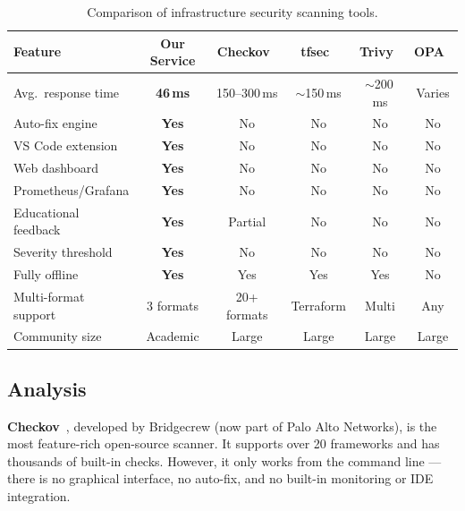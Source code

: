 \begin{table}[H]
\centering
\begin{tabular}{|l|c|c|c|c|c|}
\hline
\textbf{Feature} & \textbf{Our Service} & \textbf{Checkov}~\cite{bridgecrew2024checkov} & \textbf{tfsec}~\cite{aquasecurity2024tfsec} & \textbf{Trivy}~\cite{aquasecurity2024trivy} & \textbf{OPA}~\cite{openpolicyagent2024} \\
\hline
Avg.\ response time    & \textbf{46\,ms} & 150--300\,ms & $\sim$150\,ms & $\sim$200\,ms & Varies \\
\hline
Auto-fix engine       & \textbf{Yes}    & No           & No            & No            & No     \\
\hline
VS Code extension     & \textbf{Yes}    & No           & No            & No            & No     \\
\hline
Web dashboard         & \textbf{Yes}    & No           & No            & No            & No     \\
\hline
Prometheus/Grafana    & \textbf{Yes}    & No           & No            & No            & No     \\
\hline
Educational feedback  & \textbf{Yes}    & Partial      & No            & No            & No     \\
\hline
Severity threshold    & \textbf{Yes}    & No           & No            & No            & No     \\
\hline
Fully offline         & \textbf{Yes}    & Yes          & Yes           & Yes           & No     \\
\hline
Multi-format support  & 3 formats       & 20+ formats  & Terraform     & Multi         & Any    \\
\hline
Community size        & Academic        & Large        & Large         & Large         & Large  \\
\hline
\end{tabular}
\caption{Comparison of infrastructure security scanning tools.}
\label{tab:tool-comparison}
\end{table}

\subsection{Analysis}

\textbf{Checkov}~\cite{bridgecrew2024checkov}, developed by Bridgecrew (now part of Palo Alto Networks), is the most feature-rich open-source scanner. It supports over 20 frameworks and has thousands of built-in checks. However, it only works from the command line --- there is no graphical interface, no auto-fix, and no built-in monitoring or IDE integration.

